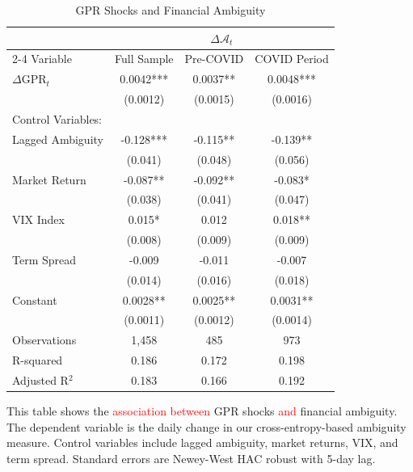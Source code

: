 \documentclass[preprint,12pt,authoryear]{elsarticle}
\begin{document}
\begin{table}[htbp]
\centering
\caption{GPR Shocks and Financial Ambiguity}
\label{tab:gpr_ambiguity}
\begin{threeparttable}
\begin{tabular*}{\textwidth}{@{\extracolsep{\fill}} lccc @{\extracolsep{\fill}}}
\toprule
& \multicolumn{3}{c}{$\Delta \mathcal{A}_{t}$} \\
\cmidrule(lr){2-4}
Variable & Full Sample & Pre-COVID & COVID Period \\
\midrule
\midrule
$\Delta$GPR$_t$ & 0.0042*** & 0.0037** & 0.0048*** \\
& (0.0012) & (0.0015) & (0.0016) \\
\midrule
Control Variables: & & & \\
Lagged Ambiguity & -0.128*** & -0.115** & -0.139** \\
& (0.041) & (0.048) & (0.056) \\
Market Return & -0.087** & -0.092** & -0.083* \\
& (0.038) & (0.041) & (0.047) \\
VIX Index & 0.015* & 0.012 & 0.018** \\
& (0.008) & (0.009) & (0.009) \\
Term Spread & -0.009 & -0.011 & -0.007 \\
& (0.014) & (0.016) & (0.018) \\
\midrule
Constant & 0.0028** & 0.0025** & 0.0031** \\
& (0.0011) & (0.0012) & (0.0014) \\
\midrule
Observations & 1,458 & 485 & 973 \\
R-squared & 0.186 & 0.172 & 0.198 \\
Adjusted R$^2$ & 0.183 & 0.166 & 0.192 \\
\bottomrule
\end{tabular*}
\begin{tablenotes}[flushleft]
\small
\item[] This table shows the \textcolor{red}{association between} GPR shocks \textcolor{red}{and} financial ambiguity. The dependent variable is the daily change in our cross-entropy-based ambiguity measure. Control variables include lagged ambiguity, market returns, VIX, and term spread. Standard errors are Newey-West HAC robust with 5-day lag.
\end{tablenotes}
\end{threeparttable}
\end{table}
\end{document}
